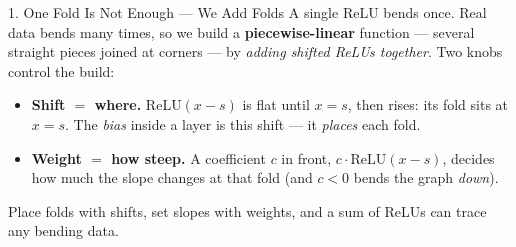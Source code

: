 \documentclass[10pt]{article}
\newcommand{\relu}{\mathrm{ReLU}}
\begin{document}
\begin{notesbox}{1. One Fold Is Not Enough --- We Add Folds}
A single ReLU bends once. Real data bends many times, so we build a \textbf{piecewise-linear} function ---
several straight pieces joined at corners --- by \emph{adding shifted ReLUs together}. Two knobs control the
build:
\begin{itemize}\setlength{\itemsep}{2pt}
  \item \textbf{Shift $=$ where.} $\relu(x-s)$ is flat until $x=s$, then rises: its fold sits at $x=s$. The
        \emph{bias} inside a layer is this shift --- it \emph{places} each fold.
  \item \textbf{Weight $=$ how steep.} A coefficient $c$ in front, $c\cdot\relu(x-s)$, decides how much the
        slope changes at that fold (and $c<0$ bends the graph \emph{down}).
\end{itemize}
Place folds with shifts, set slopes with weights, and a sum of ReLUs can trace any bending data.
\end{notesbox}
\end{document}
